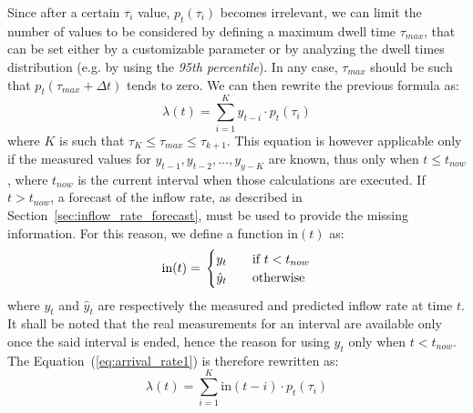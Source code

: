 Since after a certain \( \tau_i \) value, \( p_t(\tau_i) \) becomes irrelevant, we can limit the number of values to be considered by defining a maximum dwell time \( \tau_{max} \), that can be set either by a customizable parameter or by analyzing the dwell times distribution (e.g. by using the \emph{95th percentile}). In any case, \( \tau_{max} \) should be such that \( p_t(\tau_{max} + \Delta t) \) tends to zero. We can then rewrite the previous formula as:
\begin{equation}
  \lambda(t) = \sum_{i=1}^{K} y_{t-i} \cdot p_t(\tau_i)
  \label{eq:arrival_rate1}
\end{equation}
where \( K \) is such that \( \tau_K \leq \tau_{max} \leq \tau_{k+1} \). This equation is however applicable only if the measured values for \( y_{t-1}, y_{t-2}, ..., y_{y-K} \) are known, thus only when \( t \leq t_{now} \), where \( t_{now} \) is the current interval when those calculations are executed. If \( t > t_{now} \), a forecast of the inflow rate, as described in Section~\ref{sec:inflow_rate_forecast}, must be used to provide the missing information. For this reason, we define a function \( \text{in}(t) \) as:
\begin{equation}
  \text{in}(t) = \\
  \begin{cases}
    y_{t}       & \quad \text{if } t < t_{now} \\
    \hat{y}_{t} & \quad \text{otherwise}
  \end{cases}
\end{equation}
where \( y_t \) and \( \hat{y}_t \) are respectively the measured and predicted inflow rate at time \( t \). It shall be noted that the real measurements for an interval are available only once the said interval is ended, hence the reason for using \( y_t \) only when \( t < t_{now} \). The Equation~(\ref{eq:arrival_rate1}) is therefore rewritten as:
\begin{equation}
  \lambda(t) = \sum_{i=1}^{K} \text{in}(t-i) \cdot p_t(\tau_i)
\end{equation}

